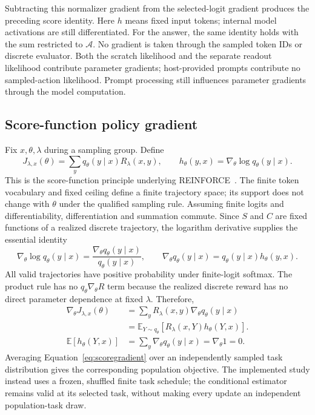 \documentclass[11pt]{article}
\newcommand{\E}{\mathbb{E}}
\begin{document}
Subtracting this normalizer gradient from the selected-logit gradient produces the preceding score identity. Here $h$ means fixed input tokens; internal model activations are still differentiated.
For the answer, the same identity holds with the sum restricted to $\mathcal A$. No gradient is taken through the sampled token IDs or discrete evaluator. Both the scratch likelihood and the separate readout likelihood contribute parameter gradients; host-provided prompts contribute no sampled-action likelihood. Prompt processing still influences parameter gradients through the model computation.

\subsection{Score-function policy gradient}

Fix $x,\theta,\lambda$ during a sampling group. Define
\begin{equation}
 J_{\lambda,x}(\theta)=\sum_y q_\theta(y\mid x)R_\lambda(x,y),
 \qquad h_\theta(y,x)=\nabla_\theta\log q_\theta(y\mid x).
\end{equation}
This is the score-function principle underlying REINFORCE~\cite{reinforce}. The finite token vocabulary and fixed ceiling define a finite trajectory space; its support does not change with $\theta$ under the qualified sampling rule. Assuming finite logits and differentiability, differentiation and summation commute. Since $S$ and $C$ are fixed functions of a realized discrete trajectory,
the logarithm derivative supplies the essential identity
\begin{equation}
 \nabla_\theta\log q_\theta(y\mid x)
    =\frac{\nabla_\theta q_\theta(y\mid x)}{q_\theta(y\mid x)},\qquad
 \nabla_\theta q_\theta(y\mid x)=q_\theta(y\mid x)h_\theta(y,x).
\end{equation}
All valid trajectories have positive probability under finite-logit softmax. The product rule has no $q_\theta\nabla_\theta R$ term because the realized discrete reward has no direct parameter dependence at fixed $\lambda$. Therefore,
\begin{align}
 \nabla_\theta J_{\lambda,x}(\theta)
 &=\sum_y R_\lambda(x,y)\nabla_\theta q_\theta(y\mid x)\\
 &=\E_{Y\sim q_\theta}[R_\lambda(x,Y)h_\theta(Y,x)].\label{eq:scoregradient}\\
 \E[h_\theta(Y,x)]&=\sum_y\nabla_\theta q_\theta(y\mid x)
                 =\nabla_\theta1=0.\label{eq:zeroscore}
\end{align}
Averaging Equation~\eqref{eq:scoregradient} over an independently sampled task distribution gives the corresponding population objective. The implemented study instead uses a frozen, shuffled finite task schedule; the conditional estimator remains valid at its selected task, without making every update an independent population-task draw.
\end{document}
